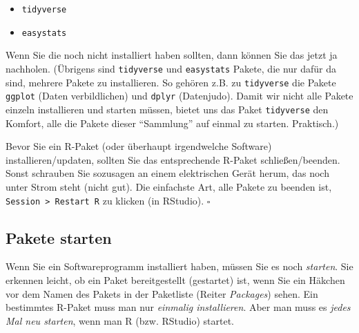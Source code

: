 \documentclass[
  letterpaper,
  twoside,
  open=any]{scrbook}
\providecommand{\tightlist}{%
  \setlength{\itemsep}{0pt}\setlength{\parskip}{0pt}}\usepackage{longtable,booktabs,array}
\theoremstyle{definition}
\theoremstyle{definition}
\theoremstyle{definition}
\theoremstyle{remark}
\begin{document}
\begin{itemize}
\tightlist
\item
  \texttt{tidyverse}
\item
  \texttt{easystats}
\end{itemize}

Wenn Sie die noch nicht installiert haben sollten, dann können Sie das
jetzt ja nachholen. (Übrigens sind \texttt{tidyverse} und
\texttt{easystats} Pakete, die nur dafür da sind, mehrere Pakete zu
installieren. So gehören z.B. zu \texttt{tidyverse} die Pakete
\texttt{ggplot} (Daten verbildlichen) und \texttt{dplyr} (Datenjudo).
Damit wir nicht alle Pakete einzeln installieren und starten müssen,
bietet uns das Paket \texttt{tidyverse} den Komfort, alle die Pakete
dieser \enquote{Sammlung} auf einmal zu starten. Praktisch.)

\begin{tcolorbox}[enhanced jigsaw, colbacktitle=quarto-callout-caution-color!10!white, colframe=quarto-callout-caution-color-frame, coltitle=black, arc=.35mm, breakable, opacitybacktitle=0.6, toprule=.15mm, colback=white, rightrule=.15mm, opacityback=0, toptitle=1mm, title=\textcolor{quarto-callout-caution-color}{\faFire}\hspace{0.5em}{Vorsicht}, titlerule=0mm, bottomtitle=1mm, bottomrule=.15mm, leftrule=.75mm, left=2mm]

Bevor Sie ein R-Paket (oder überhaupt irgendwelche Software)
installieren/updaten, sollten Sie das entsprechende R-Paket
schließen/beenden. Sonst schrauben Sie sozusagen an einem elektrischen
Gerät herum, das noch unter Strom steht (nicht gut). Die einfachste Art,
alle Pakete zu beenden ist, \texttt{Session\ \textgreater{}\ Restart\ R}
zu klicken (in RStudio). \(\square\)

\end{tcolorbox}

\subsection{Pakete starten}\label{pakete-starten}

Wenn Sie ein Softwareprogramm installiert haben, müssen Sie es noch
\emph{starten}. Sie erkennen leicht, ob ein Paket bereitgestellt
(gestartet) ist, wenn Sie ein Häkchen vor dem Namen des Pakets in der
Paketliste (Reiter \emph{Packages}) sehen. Ein bestimmtes R-Paket muss
man nur \emph{einmalig installieren}. Aber man muss es \emph{jedes Mal
neu starten}, wenn man R (bzw. RStudio) startet.
\end{document}
